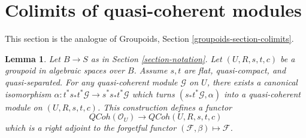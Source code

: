 \documentclass{stacks-project}
\theoremstyle{plain}
\newtheorem{lemma}[subsection]{Lemma}
\theoremstyle{definition}
\theoremstyle{remark}
\numberwithin{equation}{subsection}
\def\QCoh{\mathit{QCoh}}
\begin{document}
\section{Colimits of quasi-coherent modules}
\label{section-colimits}

\noindent
This section is the analogue of
Groupoids, Section \ref{groupoids-section-colimits}.

\begin{lemma}
\label{lemma-construct-quasi-coherent}
Let $B \to S$ as in Section \ref{section-notation}.
Let $(U, R, s, t, c)$ be a groupoid in algebraic spaces over $B$.
Assume $s, t$ are flat, quasi-compact, and quasi-separated.
For any quasi-coherent module $\mathcal{G}$ on $U$, there exists
a canonical isomorphism
$\alpha : t^*s_*t^*\mathcal{G} \to s^*s_*t^*\mathcal{G}$
which turns $(s_*t^*\mathcal{G}, \alpha)$ into a quasi-coherent module
on $(U, R, s, t, c)$. This construction defines a functor
$$
\QCoh(\mathcal{O}_U) \longrightarrow \QCoh(U, R, s, t, c)
$$
which is a right adjoint to the forgetful functor
$(\mathcal{F}, \beta) \mapsto \mathcal{F}$.
\end{lemma}
\end{document}
